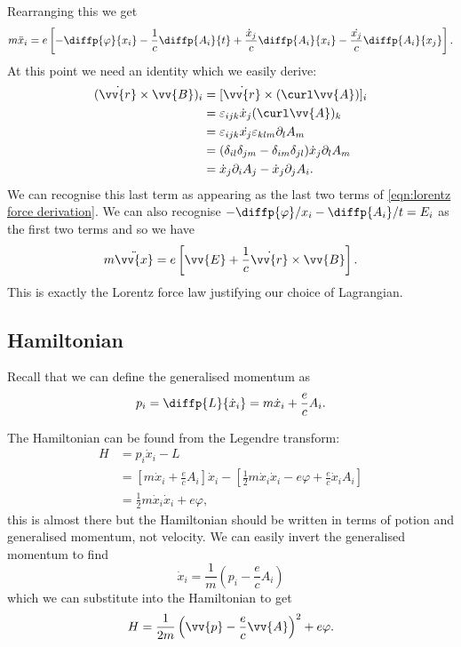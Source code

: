 \documentclass[fleqn]{NotesClass}
\newcommand*{\lagrangian}{L}
\newcommand*{\hamiltonian}{H}
\begin{document}
    Rearranging this we get
    \begin{equation}\label{eqn:lorentz force derivation}
        m\ddot{x}_i = e\left[ -\diffp{\varphi}{x_i} - \frac{1}{c}\diffp{A_i}{t} + \frac{\dot{x}_j}{c}\diffp{A_i}{x_i} - \frac{\dot{x_j}}{c}\diffp{A_i}{x_j} \right].
    \end{equation}
    At this point we need an identity which we easily derive:
    \begin{align}
        (\dot{\vv{r}}\times \vv{B})_i &= [\dot{\vv{r}}\times(\curl\vv{A})]_i\\
        &= \varepsilon_{ijk} \dot{x}_j(\curl\vv{A})_{k}\\
        &= \varepsilon_{ijk} \dot{x_j} \varepsilon_{klm}\partial_lA_m\\
        &= (\delta_{il}\delta_{jm} - \delta_{im}\delta_{jl})\dot{x}_j\partial_lA_m\\
        &= \dot{x}_j\partial_iA_j - \dot{x}_j\partial_jA_i.
    \end{align}
    We can recognise this last term as appearing as the last two terms of \cref{eqn:lorentz force derivation}.
    We can also recognise \(-\diffp{\varphi}/{x_i} - \diffp{A_i}/{t} = E_i\) as the first two terms and so we have
    \begin{equation}
        m\ddot{\vv{x}} = e\left[ \vv{E} + \frac{1}{c}\dot{\vv{r}} \times \vv{B} \right].
    \end{equation}
    This is exactly the Lorentz force law justifying our choice of Lagrangian.
    
    \subsection{Hamiltonian}\label{sec:hamiltonian}
    Recall that we can define the generalised momentum as
    \begin{equation}
        p_i = \diffp{\lagrangian}{\dot{x}_i} = m\dot{x}_i + \frac{e}{c}A_i.
    \end{equation}
    
    The Hamiltonian can be found from the Legendre transform:
    \begin{align}
        \hamiltonian &= p_i\dot{x}_i - \lagrangian\\
        &= \left[ m\dot{x}_i + \frac{e}{c}A_i \right]\dot{x}_i - \left[ \frac{1}{2}m\dot{x}_i\dot{x}_i - e\varphi + \frac{e}{c}\dot{x}_iA_i \right]\\
        &= \frac{1}{2}m\dot{x}_i\dot{x}_i + e\varphi,
    \end{align}
    this is almost there but the Hamiltonian should be written in terms of potion and generalised momentum, not velocity.
    We can easily invert the generalised momentum to find
    \begin{equation}
        \dot{x}_i = \frac{1}{m}\left( p_i - \frac{e}{c}A_i \right)
    \end{equation}
    which we can substitute into the Hamiltonian to get
    \begin{equation}
        \hamiltonian = \frac{1}{2m}\left( \vv{p} - \frac{e}{c}\vv{A} \right)^2 + e\varphi.
    \end{equation}
    
\end{document}
